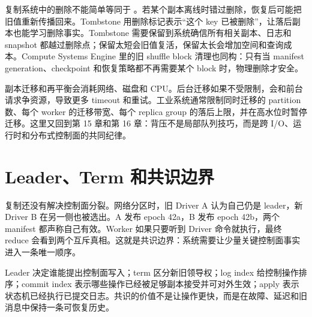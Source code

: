 复制系统中的删除不能简单等同于 。若某个副本离线时错过删除，恢复后可能把旧值重新传播回来。Tombstone 用删除标记表示“这个 key 已被删除”，让落后副本也能学习删除事实。Tombstone 需要保留到系统确信所有相关副本、日志和 snapshot 都越过删除点；保留太短会旧值复活，保留太长会增加空间和查询成本。Compute Systems Engine 里的旧 shuffle block 清理也同构：只有当 manifest generation、checkpoint 和恢复策略都不再需要某个 block 时，物理删除才安全。

副本迁移和再平衡会消耗网络、磁盘和 CPU。后台迁移如果不受限制，会和前台请求争资源，导致更多 timeout 和重试。工业系统通常限制同时迁移的 partition 数、每个 worker 的迁移带宽、每个 replica group 的落后上限，并在高水位时暂停迁移。这里又回到第 15 章和第 16 章：背压不是局部队列技巧，而是跨 I/O、运行时和分布式控制面的共同纪律。

\section{Leader、Term 和共识边界}

复制还没有解决控制面分裂。网络分区时，旧 Driver A 认为自己仍是 leader，新 Driver B 在另一侧也被选出。A 发布 epoch 42a，B 发布 epoch 42b，两个 manifest 都声称自己有效。Worker 如果只要听到 Driver 命令就执行，最终 reduce 会看到两个互斥真相。这就是共识边界：系统需要让少量关键控制面事实进入一条唯一顺序。

Leader 决定谁能提出控制面写入；term 区分新旧领导权；log index 给控制操作排序；commit index 表示哪些操作已经被足够副本接受并可对外生效；apply 表示状态机已经执行已提交日志。共识的价值不是让操作更快，而是在故障、延迟和旧消息中保持一条可恢复历史。

